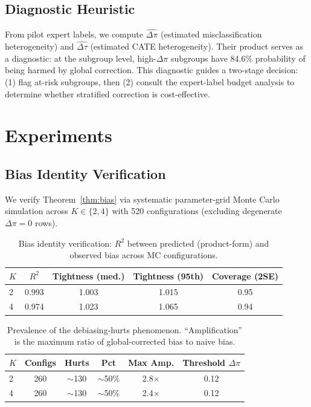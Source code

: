 \documentclass[11pt,a4paper]{article}
\newcommand{\DeltaPi}{\Delta\pi}
\newcommand{\DeltaTau}{\Delta\tau}
\begin{document}
\subsection{Diagnostic Heuristic}\label{sec:diagnostic}

From pilot expert labels, we compute $\widehat{\DeltaPi}$ (estimated misclassification heterogeneity) and $\widehat{\DeltaTau}$ (estimated CATE heterogeneity).
Their product serves as a diagnostic: at the subgroup level, high-$\DeltaPi$ subgroups have 84.6\% probability of being harmed by global correction.
This diagnostic guides a two-stage decision: (1) flag at-risk subgroups, then (2) consult the expert-label budget analysis to determine whether stratified correction is cost-effective.


\section{Experiments}

\subsection{Bias Identity Verification}\label{sec:bias_verify}

We verify Theorem~\ref{thm:bias} via systematic parameter-grid Monte Carlo simulation across $K \in \{2, 4\}$ with 520 configurations (excluding degenerate $\DeltaPi = 0$ rows).

\begin{table}[t]
\centering
\small
\caption{Bias identity verification: $R^2$ between predicted (product-form) and observed bias across MC configurations.}
\label{tab:bias_identity}
\begin{tabular}{@{}lcccc@{}}
\toprule
$K$ & $R^2$ & Tightness (med.) & Tightness (95th) & Coverage (2SE) \\
\midrule
2 & 0.993 & 1.003 & 1.015 & 0.95 \\
4 & 0.974 & 1.023 & 1.065 & 0.94 \\
\bottomrule
\end{tabular}
\end{table}

\begin{table}[t]
\centering
\small
\caption{Prevalence of the debiasing-hurts phenomenon. ``Amplification'' is the maximum ratio of global-corrected bias to naive bias.}
\label{tab:hurts}
\begin{tabular}{@{}lccccc@{}}
\toprule
$K$ & Configs & Hurts & Pct & Max Amp. & Threshold $\DeltaPi$ \\
\midrule
2 & 260 & $\sim$130 & $\sim$50\% & 2.8$\times$ & 0.12 \\
4 & 260 & $\sim$130 & $\sim$50\% & 2.4$\times$ & 0.12 \\
\bottomrule
\end{tabular}
\end{table}
\end{document}

